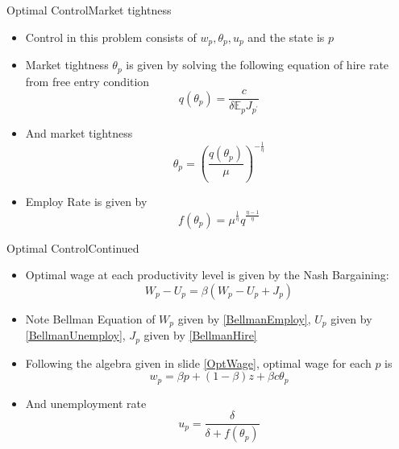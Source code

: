 \documentclass{beamer}
\begin{document}
\begin{frame}{Optimal Control}{Market tightness}
    \begin{itemize}
        \item Control in this problem consists of \(w_p, \theta_p, u_p\) and the state is \(p\)
        \item Market tightness \(\theta_p\) is given by solving the following equation of hire rate from free entry condition 
            \begin{equation}\label{HireRate}
            q(\theta_p) = \frac{c}{\delta \mathbb{E}_p J_{p^\prime}}\end{equation}
        \item And market tightness \begin{equation}
            \label{MarketTightness}
            \theta_p = (\frac{q(\theta_p)}{\mu})^{-\frac{1}{\eta}}
            \end{equation}
        \item Employ Rate is given by \begin{equation}\label{EmployRate}
            f(\theta_p) = \mu^\frac{1}{\eta} q^\frac{\eta-1}{\eta}
        \end{equation}
    \end{itemize}
\end{frame}

\begin{frame}{Optimal Control}{Continued}
    \begin{itemize}
        \item Optimal wage at each productivity level is given by the Nash Bargaining: 
        \begin{equation}\label{Nash}W_p - U_p = \beta (W_p - U_p + J_p)\end{equation}
        \item Note Bellman Equation of \(W_p\) given by \ref{BellmanEmploy}, \(U_p\) given by \ref{BellmanUnemploy}, \(J_p\) given by \ref{BellmanHire}
        \item Following the algebra given in slide \ref{OptWage}, optimal wage for each \(p\) is \begin{equation}\label{OptimalWage}
            w_p = \beta p + (1-\beta)z + \beta c \theta_p\end{equation}
        \item And unemployment rate \begin{equation}\label{UnemployRate}
            u_p = \frac{\delta}{\delta + f(\theta_p)}
        \end{equation}
    \end{itemize}
\end{frame}
\end{document}
